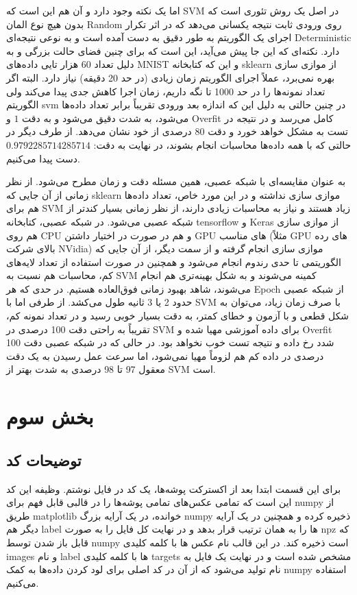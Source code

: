 \documentclass[12pt,titlepage,a4page , tikz , multi,table , svgnames,xcdraw]{article}
\begin{document}
اما یک نکته وجود دارد و آن هم این است که SVM در اصل یک روش تئوری است که بدون هیچ نوع المان Random روی ورودی ثابت نتیجه یکسانی می‌دهد که در اثر تکرار اجرای یک الگوریتم به طور دقیق به دست آمده است و به نوعی نتیجه‌ای Deterministic دارد. نکته‌ای که این جا پیش می‌آید، این است که برای چنین فضای حالت بزرگی و به دلیل تعداد 60 هزار تایی داده‌های MNIST و این که کتابخانه sklearn از موازی سازی بهره نمی‌برد، عملاً اجرای الگوریتم زمان زیادی (در حد 20 دقیقه) نیاز دارد. البته اگر تعداد نمونه‌ها را در حد 1000 تا نگه داریم، زمان اجرا کاهش جدی پیدا می‌کند ولی الگوریتم svm در چنین حالتی به دلیل این که اندازه بعد ورودی تقریباً برابر تعداد داده‌ها می‌شود، به شدت دقیق می‌شود و به دقت $1$ و Overfit کامل می‌رسد و در نتیجه در تست به مشکل خواهد خورد و دقت 80 درصدی از خود نشان می‌دهد. از طرف دیگر در حالتی که با همه داده‌ها محاسبات انجام بشوند، در نهایت به دقت: $0.9792285714285714$ دست پیدا می‌کنیم.


به عنوان مقایسه‌ای با شبکه عصبی، همین مسئله دقت و زمان مطرح می‌شود. از نظر زمانی از آن جایی که sklearn موازی سازی نداشته و در این مورد خاص، تعداد داده‌ها هم برای SVM زیاد هستند و نیاز به محاسبات زیادی دارند، از نظر زمانی بسیار کندتر از شبکه عصبی می‌شود. در شبکه عصبی، کتابخانه tensorflow و Keras از موازی سازی هم روی CPU و هم در صورت در اختیار داشتن GPU های مناسب (مثلاً GPU های رده بالای شرکت NVidia) موازی سازی انجام گرفته و از سمت دیگر، از آن جایی که الگوریتمی تا حدی رندوم انجام می‌شود و همچنین در صورت استفاده از تعداد لایه‌های کم، محاسبات هم نسبت به SVM کمینه می‌شوند و به شکل بهینه‌تری هم انجام می‌شوند، شاهد بهبود زمانی فوق‌العاده هستیم. در حدی که هر Epoch از شبکه عصبی حدود 2 یا 3 ثانیه طول می‌کشد. از طرفی اما با SVM با صرف زمان زیاد، می‌توان به شکل قطعی و با آزمون و خطای کمتر، به دقت بسیار خوبی رسید و در تعداد نمونه کم، تقریباً به راحتی دقت 100 درصدی در SVM برای داده آموزشی مهیا شده و Overfit شدد رخ داده و نتیجه تست خوب نخواهد بود. در حالی که در شبکه عصبی دقت 100 درصدی در داده کم هم لزوماً مهیا نمی‌شود، اما سرعت عمل رسیدن به یک دقت معقول 97 تا 98 درصدی به شدت بهتر از SVM است.



\section{بخش سوم}
\subsection{توضیحات کد}

برای این قسمت ابتدا بعد از اکسترکت پوشه‌ها، یک کد در فایل  نوشتم. وظیفه این کد این است که تمامی عکس‌های تمامی پوشه‌ها را در قالبی قابل فهم برای numpy از طریق matplotlib خوانده، در یک آرایه بزرگ numpy ذخیره کرده و همچنین در یک آرایه دیگر هم label ها را به همان ترتیب قرار بدهد و در نهایت کل فایل را به صورت npz که قابل باز شدن توسط numpy است ذخیره کند. در این قالب نام عکس ها با کلمه کلیدی images و نام label ها با کلمه کلیدی targets مشخص شده است و در نهایت یک فایل به نام  تولید می‌شود که از آن در کد اصلی برای لود کردن داده‌ها به کمک numpy استفاده می‌کنیم.
\end{document}
